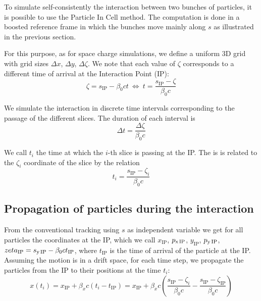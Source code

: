 To simulate self-consistently the interaction between two bunches of particles, it is possible to use the Particle In Cell method. The computation is done in a boosted reference frame in which the bunches move mainly along $s$ as illustrated in the previous section.

For this purpose, as for space charge simulations, we define a uniform 3D grid with grid sizes $\Delta x$, $\Delta y$,  $\Delta \zeta$. We note that each value of $\zeta$ corresponds to a different time of arrival at the Interaction Point (IP):
\begin{equation}
\zeta = s_\text{IP} - \beta_0 c t 
\ \Leftrightarrow \ 
t = \frac{s_\text{IP} - \zeta}{\beta_0 c}
\end{equation}

We simulate the interaction in discrete time intervals corresponding to the passage of the different slices. The duration of each interval is
\begin{equation}
\Delta t = \frac{\Delta \zeta}{\beta_0 c}
\label{eq:dtbbpic}
\end{equation}

We call $t_i$ the time at which the $i$-th slice is passing at the IP. The is is related to the $\zeta_i$ coordinate of the slice by the relation
\begin{equation}
t_i = \frac{s_\text{IP} - \zeta_i}{\beta_0 c}
\end{equation}

\subsection{Propagation of particles during the interaction}
\label{sec:prop_bb_pic}

From the conventional tracking using $s$ as independent variable we get for all particles the coordinates at the IP, which we call $x_\text{IP}$, $p_\text{x\,IP}$, $y_\text{IP}$, $p_\text{y\,IP}$, $zeta_\text{IP} = s_\text{y\,IP} - \beta_0 c t_\text{IP} $, where $t_\text{IP} $ is the time of arrival of the particle at the IP. Assuming the motion is in a drift space, for each time step, we propagate the particles from the IP to their positions at the time $t_i$:
\begin{equation}
x \left( t_i \right) = x_\text{IP} + \beta_x c\left( t_i -t_\text{IP}\right)
=
x_\text{IP} + \beta_x c\left( \frac{s_\text{IP} - \zeta_i}{\beta_0 c} -\frac{s_\text{IP} - \zeta_\text{IP}}{\beta_0 c}\right)
\end{equation}

